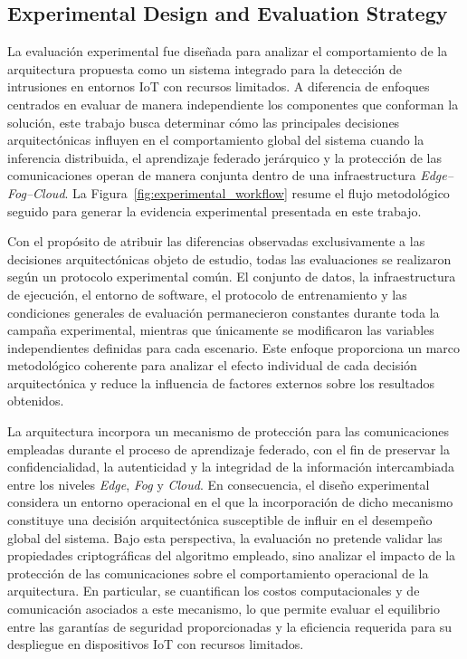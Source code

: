 \documentclass[journal,article,submit,moreauthors]{Definitions/mdpi}
\begin{document}
\subsection{Experimental Design and Evaluation Strategy}
La evaluación experimental fue diseñada para analizar el comportamiento de la arquitectura propuesta como un sistema integrado para la detección de intrusiones en entornos IoT con recursos limitados. A diferencia de enfoques centrados en evaluar de manera independiente los componentes que conforman la solución, este trabajo busca determinar cómo las principales decisiones arquitectónicas influyen en el comportamiento global del sistema cuando la inferencia distribuida, el aprendizaje federado jerárquico y la protección de las comunicaciones operan de manera conjunta dentro de una infraestructura \textit{Edge--Fog--Cloud}. La Figura~\ref{fig:experimental_workflow} resume el flujo metodológico seguido para generar la evidencia experimental presentada en este trabajo.

Con el propósito de atribuir las diferencias observadas exclusivamente a las decisiones arquitectónicas objeto de estudio, todas las evaluaciones se realizaron según un protocolo experimental común. El conjunto de datos, la infraestructura de ejecución, el entorno de software, el protocolo de entrenamiento y las condiciones generales de evaluación permanecieron constantes durante toda la campaña experimental, mientras que únicamente se modificaron las variables independientes definidas para cada escenario. Este enfoque proporciona un marco metodológico coherente para analizar el efecto individual de cada decisión arquitectónica y reduce la influencia de factores externos sobre los resultados obtenidos.

La arquitectura incorpora un mecanismo de protección para las comunicaciones empleadas durante el proceso de aprendizaje federado, con el fin de preservar la confidencialidad, la autenticidad y la integridad de la información intercambiada entre los niveles \textit{Edge}, \textit{Fog} y \textit{Cloud}. En consecuencia, el diseño experimental considera un entorno operacional en el que la incorporación de dicho mecanismo constituye una decisión arquitectónica susceptible de influir en el desempeño global del sistema. Bajo esta perspectiva, la evaluación no pretende validar las propiedades criptográficas del algoritmo empleado, sino analizar el impacto de la protección de las comunicaciones sobre el comportamiento operacional de la arquitectura. En particular, se cuantifican los costos computacionales y de comunicación asociados a este mecanismo, lo que permite evaluar el equilibrio entre las garantías de seguridad proporcionadas y la eficiencia requerida para su despliegue en dispositivos IoT con recursos limitados.
\end{document}
